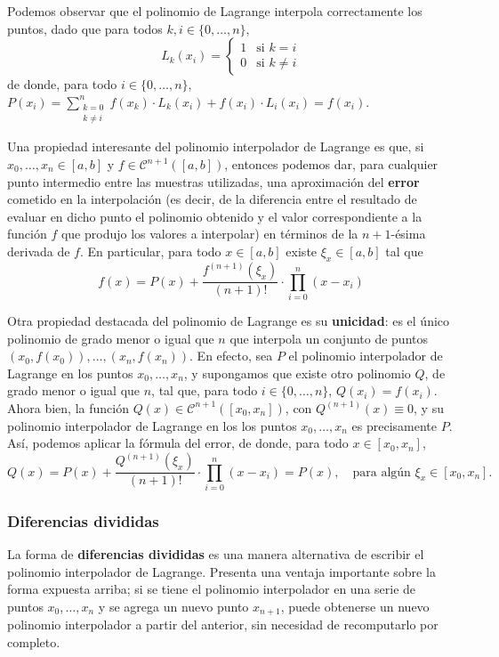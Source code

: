 Podemos observar que el polinomio de Lagrange interpola correctamente los
puntos, dado que para todos $k,i \in \{0,\dots,n\}$,
\[ L_k(x_i) = \begin{cases}
    1 & \text{si } k = i \\
    0 & \text{si } k \neq i
    \end{cases} \]
de donde, para todo $i \in \{0,\dots,n\}$, $\displaystyle P(x_i) =
    \sum_{\substack{k=0 \\ k \neq i}}^n f(x_k) \cdot L_{k}(x_i) +
    f(x_i) \cdot L_i(x_i) = f(x_i)$.

Una propiedad interesante del polinomio interpolador de Lagrange es que, si
$x_0, \dots, x_n \in [a,b]$ y $f \in \mathcal{C}^{n+1}([a,b])$, entonces
podemos dar, para cualquier punto intermedio entre las muestras utilizadas,
una aproximación del \textbf{error} cometido en la interpolación (es decir, de
la diferencia entre el resultado de evaluar en dicho punto el polinomio
obtenido y el valor correspondiente a la función $f$ que produjo los valores
a interpolar) en términos de la $n+1$-ésima derivada de $f$. En particular,
para todo $x \in [a,b]$ existe $\xi_x \in [a,b]$ tal que  
\[ f(x)
    = P(x) + \frac{f^{(n+1)}(\xi_x)}{(n+1)!} \cdot \prod_{i=0}^{n}(x-x_i) \]

Otra propiedad destacada del polinomio de Lagrange es su \textbf{unicidad}: es
el único polinomio de grado menor o igual que $n$ que interpola un conjunto de
puntos $(x_0, f(x_0)), \dots, (x_n, f(x_n))$. En efecto, sea $P$ el polinomio
interpolador de Lagrange en los puntos $x_0, \dots, x_n$, y supongamos que
existe otro polinomio $Q$, de grado menor o igual que $n$, tal que, para todo
$i \in \{0,\dots,n\}$, $Q(x_i) = f(x_i)$. Ahora bien, la función $Q(x) \in
\mathcal{C}^{n+1}([x_0,x_n])$, con $Q^{(n+1)}(x) \equiv 0$, y su polinomio
interpolador de Lagrange en los los puntos $x_0, \dots, x_n$ es precisamente
$P$. Así, podemos aplicar la fórmula del error, de donde, para todo
$x \in [x_0,x_n]$,
\[ Q(x) = P(x) + \frac{Q^{(n+1)}(\xi_x)}{(n+1)!} \cdot \prod_{i=0}^{n}(x-x_i)
    = P(x),\quad \text{para algún } \xi_x \in [x_0,x_n]. \]

\subsubsection{Diferencias divididas}
La forma de \textbf{diferencias divididas} es una manera alternativa de
escribir el polinomio interpolador de Lagrange. Presenta una ventaja importante
sobre la forma expuesta arriba; si se tiene el polinomio interpolador en
una serie de puntos $x_0, \dots, x_n$ y se agrega un nuevo punto $x_{n+1}$,
puede obtenerse un nuevo polinomio interpolador a partir del anterior, sin
necesidad de recomputarlo por completo.

